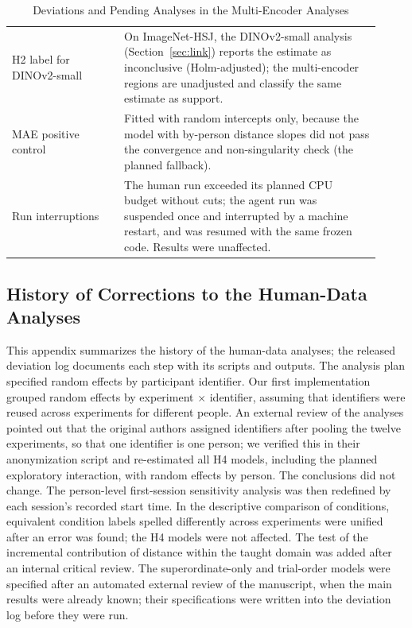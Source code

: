 \documentclass[11pt]{article}
\begin{document}
\begin{table}[!htbp]
\begin{tabular}{p{0.28\linewidth}p{0.64\linewidth}}
H2 label for DINOv2-small & On ImageNet-HSJ, the DINOv2-small analysis (Section~\ref{sec:link}) reports the estimate as inconclusive (Holm-adjusted); the multi-encoder regions are unadjusted and classify the same estimate as support. \\
MAE positive control & Fitted with random intercepts only, because the model with by-person distance slopes did not pass the convergence and non-singularity check (the planned fallback). \\
Run interruptions & The human run exceeded its planned CPU budget without cuts; the agent run was suspended once and interrupted by a machine restart, and was resumed with the same frozen code. Results were unaffected. \\
\bottomrule
\end{tabular}
\caption{Deviations and Pending Analyses in the Multi-Encoder Analyses}
\label{tab:devtwo}
\end{table}

\subsection{History of Corrections to the Human-Data Analyses}
\label{app:history}

This appendix summarizes the history of the human-data analyses; the released deviation log documents each step with its scripts and outputs. The analysis plan specified random effects by participant identifier. Our first implementation grouped random effects by experiment $\times$ identifier, assuming that identifiers were reused across experiments for different people. An external review of the analyses pointed out that the original authors assigned identifiers after pooling the twelve experiments, so that one identifier is one person; we verified this in their anonymization script and re-estimated all H4 models, including the planned exploratory interaction, with random effects by person. The conclusions did not change. The person-level first-session sensitivity analysis was then redefined by each session's recorded start time. In the descriptive comparison of conditions, equivalent condition labels spelled differently across experiments were unified after an error was found; the H4 models were not affected. The test of the incremental contribution of distance within the taught domain was added after an internal critical review. The superordinate-only and trial-order models were specified after an automated external review of the manuscript, when the main results were already known; their specifications were written into the deviation log before they were run.
\end{document}
